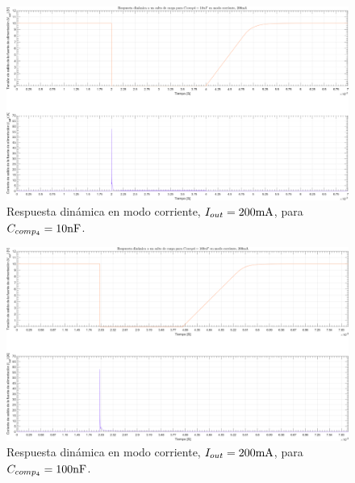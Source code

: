\clearpage

\begin{figure}[H] %
\begin{center}
\includegraphics[width=1.1 \textwidth, angle=90]{./img/plots/dynamic/power_supply_CCOMP4_10n_STEP_Modo4.png}
\caption{\label{fig:fig_power_supply_CCOMP4_STEP_10n_Modo4}\footnotesize{Respuesta dinámica en modo corriente, $I_{out} = 200 \si[per-mode=symbol]{\milli\ampere}$, para $C_{comp_{4}} = 10 \si[per-mode=symbol]{\nano\farad} $.}}
\end{center}
\end{figure}

\clearpage

\begin{figure}[H] %
\begin{center}
\includegraphics[width=1.1 \textwidth, angle=90]{./img/plots/dynamic/power_supply_CCOMP4_100n_STEP_Modo4.png}
\caption{\label{fig:fig_power_supply_CCOMP4_STEP_100n_Modo4}\footnotesize{Respuesta dinámica en modo corriente, $I_{out} = 200 \si[per-mode=symbol]{\milli\ampere}$, para $C_{comp_{4}} = 100 \si[per-mode=symbol]{\nano\farad} $.}}
\end{center}
\end{figure}

\clearpage




